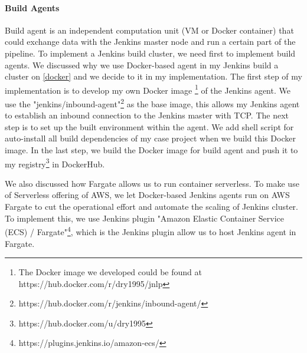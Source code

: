 \paragraph[]{Build Agents}
Build agent is an independent computation unit (VM or Docker container) that could exchange data with the Jenkins master node and run a certain part of the pipeline. To implement a Jenkins build cluster, we need first to implement build agents.
We discussed why we use Docker-based agent in my Jenkins build a cluster on \ref{docker} and we decide to it in my implementation. The first step of my implementation is to develop my own Docker image \footnote{The Docker image we developed could be found at https://hub.docker.com/r/dry1995/jnlp} of the Jenkins agent. We use the "jenkins/inbound-agent"\footnote{https://hub.docker.com/r/jenkins/inbound-agent/} as the base image, this allows my Jenkins agent to establish an inbound connection to the Jenkins master with TCP. The next step is to set up the built environment within the agent. We add shell script for auto-install all build dependencies of my case project when we build this Docker image. In the last step, we build the Docker image for build agent and push it to my registry\footnote{https://hub.docker.com/u/dry1995} in DockerHub. 
\par
We also discussed how Fargate allows us to run container serverless. To make use of Serverless offering of AWS, we let Docker-based Jenkins agents run on AWS Fargate to cut the operational effort and automate the scaling of Jenkins cluster. To implement this, we use Jenkins plugin "Amazon Elastic Container Service (ECS) / Fargate"\footnote{https://plugins.jenkins.io/amazon-ecs/}, which is the Jenkins plugin allow us to host Jenkins agent in Fargate.  
